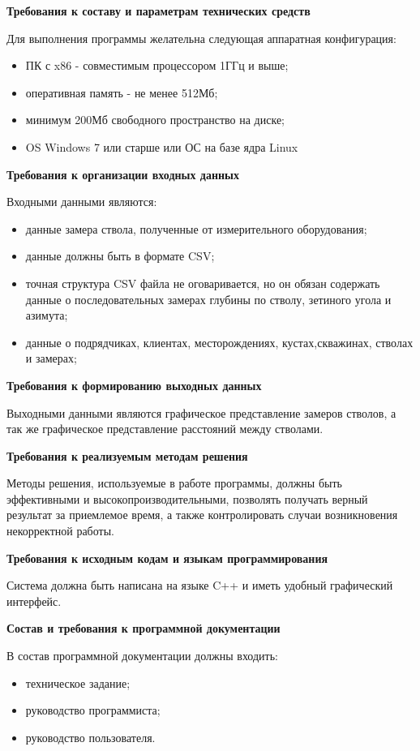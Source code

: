 \textbf{Требования к составу и параметрам технических средств}

Для выполнения программы желательна следующая аппаратная конфигурация:

\begin{itemize}
  \item ПК с x86 - совместимым процессором 1ГГц и выше;
  \item оперативная память - не менее 512Мб;
  \item минимум 200Мб свободного пространство на диске;
  \item OS Windows 7 или старше или ОС на базе ядра Linux
\end{itemize}

\textbf{Требования к организации входных данных}

Входными данными являются:
\begin{itemize}
  \item данные замера ствола, полученные от измерительного оборудования;
  \item данные должны быть в формате CSV;
  \item точная структура CSV файла не оговаривается, но он обязан содержать данные о последовательных замерах
    глубины по стволу, зетиного угола и азимута;
  \item данные о подрядчиках, клиентах, месторождениях, кустах,скважинах, стволах и замерах;
\end{itemize}

\textbf{Требования к формированию выходных данных}

Выходными данными являются графическое представление замеров стволов, а так же графическое представление расстояний
между стволами.

\textbf{Требования к реализуемым методам решения}

Методы решения, используемые в работе программы, должны быть эффективными и высокопроизводительными,
позволять получать верный результат за приемлемое время, а также контролировать случаи возникновения некорректной работы.

\textbf{Требования к исходным кодам и языкам программирования}

Система должна быть написана на языке C++ и иметь удобный графический интерфейс.

\textbf{Состав и требования к программной документации}

В состав программной документации должны входить:
\begin{itemize}
  \item техническое задание;
  \item руководство программиста;
  \item руководство пользователя.
\end{itemize}
